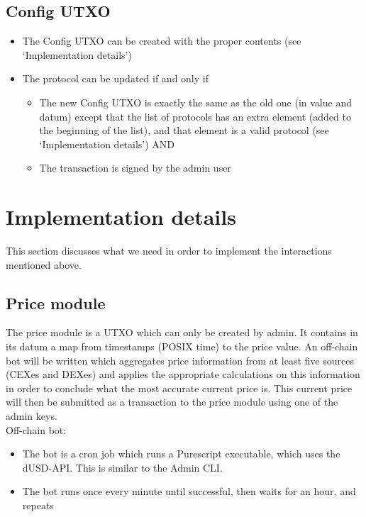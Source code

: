 \documentclass{article} %
\begin{document}
\subsection{Config UTXO}

\begin{itemize}
  \item The Config UTXO can be created with the proper contents (see
    `Implementation details')
  \item The protocol can be updated if and only if
    \begin{itemize}
      \item The new Config UTXO is exactly the same as the old one (in value and
        datum) except that the list of protocols has an extra element (added to
        the beginning of the list), and that element is a valid protocol (see
        `Implementation details') AND
      \item The transaction is signed by the admin user
    \end{itemize}
\end{itemize}

\section{Implementation details}

This section discusses what we need in order to implement the interactions
mentioned above.

\subsection{Price module}

The price module is a UTXO which can only be created by admin.
It contains in its datum a map from timestamps (POSIX time) to the price value.
An off-chain bot will be written which aggregates price information from at
least five sources (CEXes and DEXes) and applies the appropriate calculations on
this information in order to conclude what the most accurate current price is.
This current price will then be submitted as a transaction to the price module
using one of the admin keys. \\

Off-chain bot:
\begin{itemize}
  \item The bot is a cron job which runs a Purescript executable, which uses the
    dUSD-API. This is similar to the Admin CLI.
  \item The bot runs once every minute until successful, then waits for an hour,
    and repeats
\end{itemize}
\end{document}
